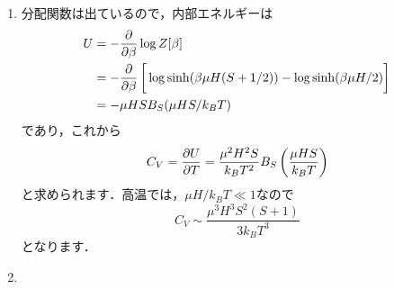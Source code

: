 \documentclass[a4paper,pdflatex,ja=standard]{bxjsarticle}
\begin{document}
\begin{enumerate}
  \item 

  分配関数は出ているので，内部エネルギーは
  \begin{align}
    U
    &=
    -\pdv{}{\beta}\log Z[\beta]
    \nonumber
    \\
    &=
    -\pdv{}{\beta}    
    \left[  
      \vphantom{\dfrac{1}{2}}
      \log\sinh(\beta\mu H(S+1/2))
      -
      \log\sinh(\beta\mu H/2)
    \right]
    \nonumber
    \\
    &=
    -\mu HS B_S(\mu HS/k_BT)
  \end{align}
  であり，これから
  \begin{equation}
    C_V
    =
    \pdv{U}{T}
    =
    \frac{\mu^2H^2S}{k_BT^2}
    B_S\left( \frac{\mu HS}{k_BT} \right)
  \end{equation}
  と求められます．高温では，$\mu H/k_BT\ll 1$なので
  \begin{equation}
    C_V
    \sim
    \frac{\mu^3H^3S^2(S+1)}{3k_BT^3}
  \end{equation}
  となります．


  \item 


\end{enumerate}
\end{document}
